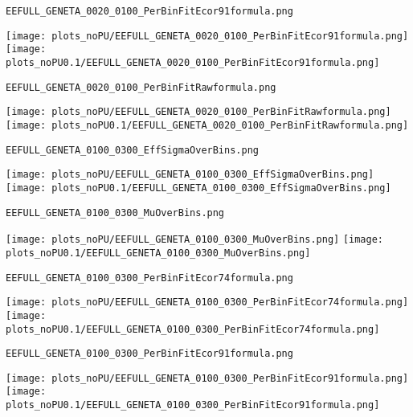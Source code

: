 \begin{frame}[fragile]
\begin{verbatim}
EEFULL_GENETA_0020_0100_PerBinFitEcor91formula.png
\end{verbatim}
\texttt{[image: plots\_noPU/EEFULL\_GENETA\_0020\_0100\_PerBinFitEcor91formula.png]}
\texttt{[image: plots\_noPU0.1/EEFULL\_GENETA\_0020\_0100\_PerBinFitEcor91formula.png]}
\end{frame}
\begin{frame}[fragile]
\begin{verbatim}
EEFULL_GENETA_0020_0100_PerBinFitRawformula.png
\end{verbatim}
\texttt{[image: plots\_noPU/EEFULL\_GENETA\_0020\_0100\_PerBinFitRawformula.png]}
\texttt{[image: plots\_noPU0.1/EEFULL\_GENETA\_0020\_0100\_PerBinFitRawformula.png]}
\end{frame}
\begin{frame}[fragile]
\begin{verbatim}
EEFULL_GENETA_0100_0300_EffSigmaOverBins.png
\end{verbatim}
\texttt{[image: plots\_noPU/EEFULL\_GENETA\_0100\_0300\_EffSigmaOverBins.png]}
\texttt{[image: plots\_noPU0.1/EEFULL\_GENETA\_0100\_0300\_EffSigmaOverBins.png]}
\end{frame}
\begin{frame}[fragile]
\begin{verbatim}
EEFULL_GENETA_0100_0300_MuOverBins.png
\end{verbatim}
\texttt{[image: plots\_noPU/EEFULL\_GENETA\_0100\_0300\_MuOverBins.png]}
\texttt{[image: plots\_noPU0.1/EEFULL\_GENETA\_0100\_0300\_MuOverBins.png]}
\end{frame}
\begin{frame}[fragile]
\begin{verbatim}
EEFULL_GENETA_0100_0300_PerBinFitEcor74formula.png
\end{verbatim}
\texttt{[image: plots\_noPU/EEFULL\_GENETA\_0100\_0300\_PerBinFitEcor74formula.png]}
\texttt{[image: plots\_noPU0.1/EEFULL\_GENETA\_0100\_0300\_PerBinFitEcor74formula.png]}
\end{frame}
\begin{frame}[fragile]
\begin{verbatim}
EEFULL_GENETA_0100_0300_PerBinFitEcor91formula.png
\end{verbatim}
\texttt{[image: plots\_noPU/EEFULL\_GENETA\_0100\_0300\_PerBinFitEcor91formula.png]}
\texttt{[image: plots\_noPU0.1/EEFULL\_GENETA\_0100\_0300\_PerBinFitEcor91formula.png]}
\end{frame}

